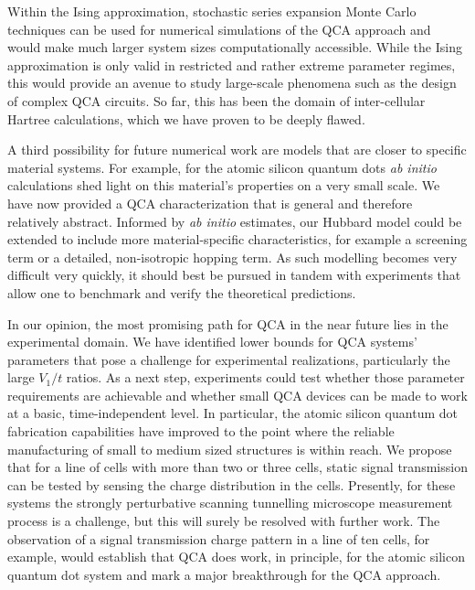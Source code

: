 Within the Ising approximation, stochastic series expansion Monte Carlo techniques
can be used for numerical simulations of the QCA approach and would make much
larger system sizes computationally accessible. While the Ising approximation is
only valid in restricted and rather extreme parameter regimes, this would
provide an avenue to study large-scale phenomena such as the design of
complex QCA circuits. So far, this has been the domain of inter-cellular Hartree
calculations, which we have proven to be deeply flawed.

A third possibility for future numerical work are models that are closer to
specific material systems. For example, for the atomic silicon quantum dots
\emph{ab initio} calculations shed light on this material's properties on a very
small scale. We have now provided a QCA characterization that is general and
therefore relatively abstract. Informed by \emph{ab initio} estimates, our
Hubbard model could be extended to include more material-specific
characteristics, for example a screening term or a detailed, non-isotropic
hopping term. As such modelling becomes very difficult very quickly, it should
best be pursued in tandem with experiments that allow one to benchmark and
verify the theoretical predictions.

In our opinion, the most promising path for QCA in the near future lies in the
experimental domain. We have identified lower bounds for QCA systems' parameters
that pose a challenge for experimental realizations, particularly the large
$V_1/t$ ratios. As a next step, experiments could test whether those parameter
requirements are achievable and whether small QCA devices can be made to work at
a basic, time-independent level. In particular, the atomic silicon quantum dot
fabrication capabilities have improved to the point where the reliable
manufacturing of small to medium sized structures is within reach. We propose
that for a line of cells with more than two or three cells, static signal
transmission can be tested by sensing the charge distribution in the cells.
Presently, for these systems the strongly perturbative scanning tunnelling
microscope measurement process is a challenge, but this will surely be
resolved with further work. The observation of a signal transmission charge
pattern in a line of ten cells, for example, would establish that QCA does work,
in principle, for the atomic silicon quantum dot system and mark a major
breakthrough for the QCA approach.

